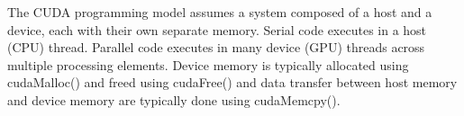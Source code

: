 The CUDA programming model assumes a system composed of a host and a device, each with their own separate memory. Serial code executes in a host (CPU) thread. Parallel code executes in many device (GPU) threads across multiple processing elements. Device memory is typically allocated using cudaMalloc() and freed using cudaFree() and data transfer between host memory and device memory are typically done using cudaMemcpy(). 

